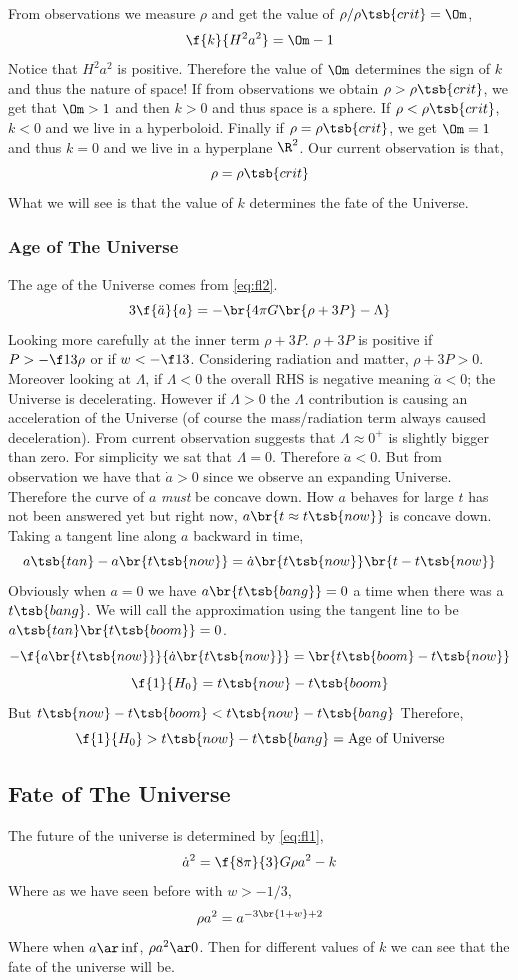 \documentclass{article}
\begin{document}
From observations we measure $\rho$ and get the value of $\rho/\rho\tsb{crit} = \Om$,
\[ \f{k}{H^2 a^2} = \Om - 1 \]
Notice that $H^2 a^2$ is positive. Therefore the value of $\Om$ determines the sign of $k$ and thus the nature of space! If from observations we obtain $\rho > \rho\tsb{crit}$, we get that $\Om > 1$ and then $k > 0$ and thus space is a sphere. If $\rho < \rho\tsb{crit}$, $k < 0$ and we live in a hyperboloid. Finally if $\rho = \rho\tsb{crit}$, we get $\Om = 1$ and thus $k = 0$ and we live in a hyperplane $\R^2$. Our current observation is that,
\[ \rho = \rho\tsb{crit} \]
What we will see is that the value of $k$ determines the fate of the Universe.

\subsubsection{Age of The Universe}
The age of the Universe comes from \eqref{eq:fl2}.
\[ 3 \f{\ddot{a}}{a} = - \br{4 \pi G\br{\rho + 3 P} - \Lambda} \]
Looking more carefully at the inner term $\rho + 3 P$. $\rho + 3 P$ is positive if $P > -\f13 \rho$ or if $w < -\f13$. Considering radiation and matter, $\rho + 3 P > 0$. Moreover looking at $\Lambda$, if $\Lambda < 0$ the overall RHS is negative meaning $\ddot{a} < 0$; the Universe is decelerating. However if $\Lambda > 0$ the $\Lambda$ contribution is causing an acceleration of the Universe (of course the mass/radiation term always caused deceleration). From current observation suggests that $\Lambda \approx 0^+$ is slightly bigger than zero. For simplicity we sat that $\Lambda = 0$. Therefore $\ddot{a} < 0$. But from observation we have that $\dot{a} > 0$ since we observe an expanding Universe. Therefore the curve of $a$ \textit{must} be concave down. How $a$ behaves for large $t$ has not been answered yet but right now, $a\br{t \approx t\tsb{now}}$ is concave down. Taking a tangent line along $a$ backward in time,
\[ a\tsb{tan} - a\br{t\tsb{now}} = \dot{a}\br{t\tsb{now}}\br{t - t\tsb{now}}  \]
Obviously when $a = 0$ we have $a\br{t\tsb{bang}} = 0$ a time when there was a $t\tsb{bang}$. We will call the approximation using the tangent line to be $a\tsb{tan}\br{t\tsb{boom}} = 0$.
\[ -\f{a\br{t\tsb{now}}}{\dot{a}\br{t\tsb{now}}} = \br{t\tsb{boom} - t\tsb{now}} \]
\[ \f{1}{H_0} = t\tsb{now} - t\tsb{boom} \]
But $t\tsb{now} - t\tsb{boom} < t\tsb{now} - t\tsb{bang}$
Therefore,
\[ \f{1}{H_0} > t\tsb{now} - t\tsb{bang} = \text{Age of Universe} \]

\subsection{Fate of The Universe}
The future of the universe is determined by \eqref{eq:fl1},
\[ \dot{a}^2 = \f{8\pi}{3}G \rho a^2 - k \]
Where as we have seen before with $w > -1/3$,
\[ \rho a^2 = a^{-3 \br{1 + w} + 2} \]
Where when $a \ar \inf$, $\rho a^2 \ar 0$. Then for different values of $k$ we can see that the fate of the universe will be. \\
\end{document}
